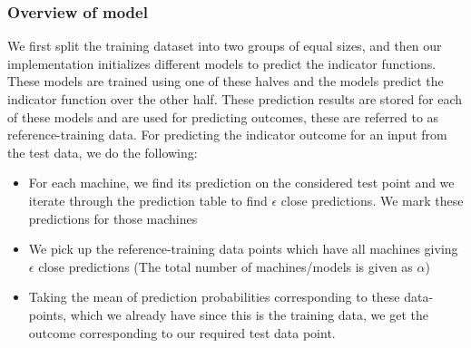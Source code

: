 \documentclass[13pt]{article}
\begin{document}
\subsubsection{Overview of model}
We first split the training dataset into two groups of equal sizes, and then our implementation initializes different models to predict the indicator functions. These models are trained using one of these halves and the models predict the indicator function over the other half.  These prediction results are stored for each of these models and are used for predicting outcomes, these are referred to as reference-training data. For predicting the indicator outcome for an input from the test data, we do the following:
\begin{itemize}
    \item For each machine, we find its prediction on the considered test point and we iterate through the prediction table to find $\epsilon$ close predictions. We mark these predictions for those machines
    \item We pick up the reference-training data points which have all machines giving $\epsilon$ close predictions (The total number of machines/models is given as $\alpha$) 
    \item Taking the mean of prediction probabilities corresponding to these data-points, which we already have since this is the training data, we get the outcome corresponding to our required test data point.   
\end{itemize}
\end{document}
